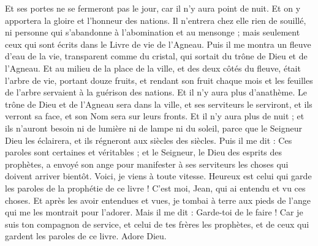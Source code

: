 \begin{multicols}{2}
Et ses portes ne se fermeront pas le jour, car il n'y aura point de nuit.
Et on y apportera la gloire et l'honneur des nations.
Il n'entrera chez elle rien de souillé, ni personne qui s'abandonne à l'abomination et au mensonge ; mais seulement ceux qui sont écrits dans le Livre de vie de l'Agneau.
\VerseOne{}Puis il me montra un fleuve d'eau de la vie, transparent comme du cristal, qui sortait du trône de Dieu et de l'Agneau.
Et au milieu de la place de la ville, et des deux côtés du fleuve, était l'arbre de vie, portant douze fruits, et rendant son fruit chaque mois et les feuilles de l'arbre servaient à la guérison des nations.
Et il n'y aura plus d'anathème. Le trône de Dieu et de l'Agneau sera dans la ville, et ses serviteurs le serviront,
et ils verront sa face, et son Nom sera sur leurs fronts.
Et il n'y aura plus de nuit ; et ils n'auront besoin ni de lumière ni de lampe ni du soleil, parce que le Seigneur Dieu les éclairera, et ils régneront aux siècles des siècles.
Puis il me dit : Ces paroles sont certaines et véritables ; et le Seigneur, le Dieu des esprits des prophètes, a envoyé son ange pour manifester à ses serviteurs les choses qui doivent arriver bientôt.
Voici, je viens à toute vitesse. Heureux est celui qui garde les paroles de la prophétie de ce livre !
C'est moi, Jean, qui ai entendu et vu ces choses. Et après les avoir entendues et vues, je tombai à terre aux pieds de l'ange qui me les montrait pour l'adorer.
Mais il me dit : Garde-toi de le faire ! Car je suis ton compagnon de service, et celui de tes frères les prophètes, et de ceux qui gardent les paroles de ce livre. Adore Dieu.

\end{multicols}
